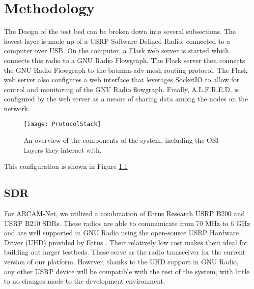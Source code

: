 
\chapter{Methodology} %

\label{Chapter3} %




The Design of the test bed can be broken down into several subsections. The lowest layer is made up of a USRP Software Defined Radio, connected to a computer over USB. On the computer, a Flask web server is started which connects this radio to a GNU Radio Flowgraph. The Flask server then connects the GNU Radio Flowgraph to the batman-adv mesh routing protocol. The Flask web server also configures a web interface that leverages SocketIO to allow for control and monitoring of the GNU Radio flowgraph. Finally, A.L.F.R.E.D. is configured by the web server as a means of sharing data among the nodes on the network. 

\begin{figure}
	\centering
	\texttt{[image: ProtocolStack]}
	\caption{An overview of the components of the system, including the OSI Layers they interact with. \cite{0003} \cite{0007} \cite{0008} \cite{0015} \cite{0012} \cite{0011}}
	\label{fig:ProtocolStack}
\end{figure}

This configuration is shown in Figure \ref{fig:ProtocolStack}

\section{SDR}

For ARCAM-Net, we utilized a combination of Ettus Research USRP B200 and USRP B210 SDRs. These radios are able to communicate from 70 MHz to 6 GHz and are well supported in GNU Radio using the open-source USRP Hardware Driver (UHD) provided by Ettus \cite{0007}. Their relatively low cost makes them ideal for building out larger testbeds. These serve as the radio transceiver for the current version of our platform. However, thanks to the UHD support in GNU Radio, any other USRP device will be compatible with the rest of the system, with little to no changes made to the development environment. 

